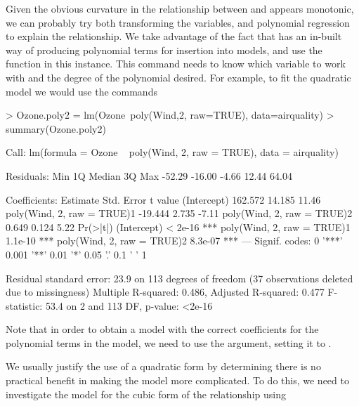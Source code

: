 Given the obvious curvature in the relationship between  and  appears monotonic, we can probably try both transforming the variables, and polynomial regression to explain the relationship. We take advantage of the  
fact that \R{} has an in-built way of producing polynomial terms for insertion into models, and use the  function in this instance. This command needs to know which variable to work with and the degree of the polynomial desired. For example, to fit the quadratic model we would use the commands 

\begin{Schunk}
\begin{Sinput}
> Ozone.poly2 = lm(Ozone~poly(Wind,2, raw=TRUE), data=airquality) 
> summary(Ozone.poly2) 
\end{Sinput}
\begin{Soutput}

Call:
lm(formula = Ozone ~ poly(Wind, 2, raw = TRUE), data = airquality)

Residuals:
   Min     1Q Median     3Q    Max 
-52.29 -16.00  -4.66  12.44  64.04 

Coefficients:
                           Estimate Std. Error t value
(Intercept)                 162.572     14.185   11.46
poly(Wind, 2, raw = TRUE)1  -19.444      2.735   -7.11
poly(Wind, 2, raw = TRUE)2    0.649      0.124    5.22
                           Pr(>|t|)    
(Intercept)                 < 2e-16 ***
poly(Wind, 2, raw = TRUE)1  1.1e-10 ***
poly(Wind, 2, raw = TRUE)2  8.3e-07 ***
---
Signif. codes:  
0 '***' 0.001 '**' 0.01 '*' 0.05 '.' 0.1 ' ' 1

Residual standard error: 23.9 on 113 degrees of freedom
  (37 observations deleted due to missingness)
Multiple R-squared:  0.486,	Adjusted R-squared:  0.477 
F-statistic: 53.4 on 2 and 113 DF,  p-value: <2e-16
\end{Soutput}
\end{Schunk}

Note that in order to obtain a model with the correct coefficients for the polynomial terms in the model, we need to use the  argument, setting it to .  
 
We usually justify the use of a quadratic form by determining there is no practical benefit in making the model more complicated. To do this, we need to investigate the model for the cubic form of the relationship using 

